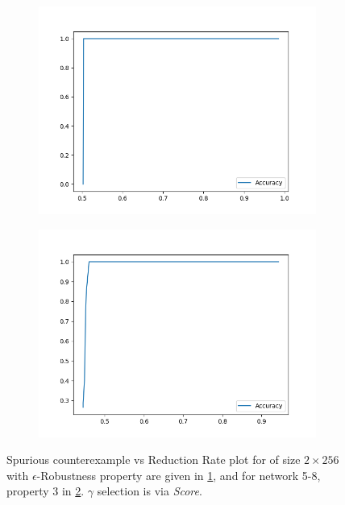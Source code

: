 \begin{figure}

    \begin{subfigure}{0.475\linewidth}
        \includegraphics[scale=0.4]{figs/mnist_2_256_prop_0_0.03_samples.png}
        \caption{}
        \label{f:mnist-prop-samples}
    \end{subfigure}
    \begin{subfigure}{0.475\linewidth}
        \includegraphics[scale=0.4]{figs/acas_ncex_5_8_3_samples.png}
        \caption{}
        \label{f:acas-ncex-samples}
    \end{subfigure}

    \caption{
        Spurious counterexample vs Reduction Rate plot for \mnist of size $2
        \times 256$ with $\epsilon$-Robustness property are given in 
        \ref{f:mnist-prop-samples}, and for \acasxu
        network 5-8, property 3 in \ref{f:acas-ncex-samples}.
        $\gamma$ selection is via \emph{Score}. 
    }
    \label{f:ncex}
\end{figure}

